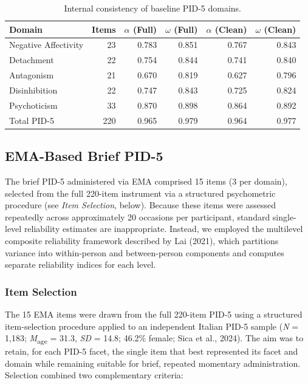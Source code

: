 \documentclass[
  english,
  man,floatsintext]{apa6}
\begin{document}
\begin{table}

\caption{\label{tab:table-s1-pid5-reliability}Internal consistency of baseline PID-5 domains.}
\centering
\begin{tabular}[t]{lrrrrr}
\toprule
Domain & Items & $\alpha$ (Full) & $\omega$ (Full) & $\alpha$ (Clean) & $\omega$ (Clean)\\
\midrule
Negative Affectivity & 23 & 0.783 & 0.851 & 0.767 & 0.843\\
Detachment & 22 & 0.754 & 0.844 & 0.741 & 0.840\\
Antagonism & 21 & 0.670 & 0.819 & 0.627 & 0.796\\
Disinhibition & 22 & 0.747 & 0.843 & 0.725 & 0.824\\
Psychoticism & 33 & 0.870 & 0.898 & 0.864 & 0.892\\
\addlinespace
Total PID-5 & 220 & 0.965 & 0.979 & 0.964 & 0.977\\
\bottomrule
\end{tabular}
\end{table}

\subsection{EMA-Based Brief PID-5}\label{ema-based-brief-pid-5}

The brief PID-5 administered via EMA comprised 15 items (3 per domain), selected from the full 220-item instrument via a structured psychometric procedure (see \emph{Item Selection}, below). Because these items were assessed repeatedly across approximately 20 occasions per participant, standard single-level reliability estimates are inappropriate. Instead, we employed the multilevel composite reliability framework described by Lai (2021), which partitions variance into within-person and between-person components and computes separate reliability indices for each level.

\subsubsection{Item Selection}\label{item-selection}

The 15 EMA items were drawn from the full 220-item PID-5 using a structured item-selection procedure applied to an independent Italian PID-5 sample (\emph{N} = 1,183; \emph{M}\textsubscript{age} = 31.3, \emph{SD} = 14.8; 46.2\% female; Sica et al., 2024). The aim was to retain, for each PID-5 facet, the single item that best represented its facet and domain while remaining suitable for brief, repeated momentary administration. Selection combined two complementary criteria:
\end{document}
